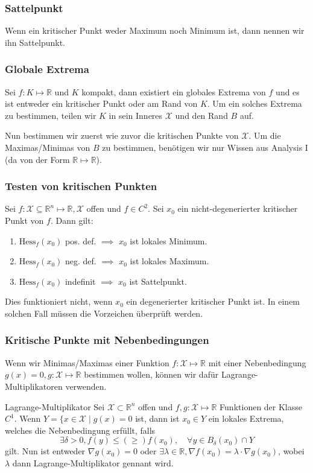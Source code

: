 \documentclass[a4paper,10pt]{article}
\def\R{\mathbb{R}}
\def\X{\mathcal{X}}
\begin{document}
\subsubsection*{Sattelpunkt}
Wenn ein kritischer Punkt weder Maximum noch Minimum ist, dann nennen wir ihn Sattelpunkt.

\subsubsection*{Globale Extrema}
Sei \(f: K \mapsto \R\) und \(K\) kompakt, dann existiert ein globales Extrema von \(f\) und es ist entweder ein kritischer Punkt oder am Rand von \(K\). Um ein solches Extrema zu bestimmen, teilen wir \(K\) in sein Inneres \(\X\) und den Rand \(B\) auf. 

Nun bestimmen wir zuerst wie zuvor die kritischen Punkte von \(\X\). Um die Maximas/Minimas von \(B\) zu bestimmen, benötigen wir nur Wissen aus Analysis I (da von der Form \(\R \mapsto \R\)).
\subsubsection*{Testen von kritischen Punkten}
Sei \(f: \X \subseteq \R^n \mapsto \R, \X\) offen und \(f\in C^2\). Sei \(x_0\) ein nicht-degenerierter kritischer Punkt von \(f\). Dann gilt:
\begin{enumerate}
  \item $\text{Hess}_f(x_0)$ pos. def. \(\implies\) $x_0$ ist lokales Minimum.
  \item $\text{Hess}_f(x_0)$ neg. def. \(\implies\) $x_0$ ist lokales Maximum.
  \item $\text{Hess}_f(x_0)$ indefinit \(\implies\) $x_0$ ist Sattelpunkt.
\end{enumerate}
Dies funktioniert nicht, wenn \(x_0\) ein degenerierter kritischer Punkt ist. In einem solchen Fall müssen die Vorzeichen überprüft werden.
\subsubsection*{Kritische Punkte mit Nebenbedingungen}
Wenn wir Minimas/Maximas einer Funktion \(f: \X \mapsto \R\) mit einer Nebenbedingung \(g(x) = 0, g: \X \mapsto \R\) bestimmen wollen, können wir dafür Lagrange-Multiplikatoren verwenden.
\begin{subbox}{Lagrange-Multiplikator}
  Sei \(\X \subset \R^n\) offen und \(f,g: \X \mapsto \R\) Funktionen der Klasse \(C^1\). Wenn \(Y = \{x \in \X \mid g(x) = 0\) ist, dann ist \(x_0 \in Y\) ein lokales Extrema, welches die Nebenbedingung erfüllt, falls 
  \[\exists \delta > 0, f(y) \le (\ge) f(x_0), \quad \forall y \in B_\delta(x_0) \cap Y\]
  gilt. Nun ist entweder \(\nabla g(x_0) = 0\) oder \(\exists \lambda \in \R, \nabla f(x_0) = \lambda \cdot \nabla g(x_0)\), wobei \(\lambda\) dann Lagrange-Multiplikator gennant wird.
\end{subbox}
\end{document}
